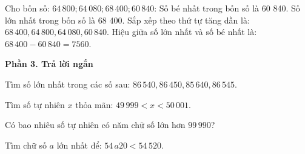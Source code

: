 \begin{ex} %
Cho bốn số: $64\,800; 64\,080; 68\,400; 60\,840$:
\choiceTF
{\True Số bé nhất trong bốn số là 60 840.}
{\True Số lớn nhất trong bốn số là 68 400.}
{Sắp xếp theo thứ tự tăng dần là: $68\,400, 64\,800, 64\,080, 60\,840$.}
{\True Hiệu giữa số lớn nhất và số bé nhất là: $68\,400 - 60\,840 = 7560$.}
\end{ex}

\textbf{Phần 3. Trả lời ngắn}

\begin{ex} %
Tìm số lớn nhất trong các số sau: $86\,540, 86\,450, 85\,640, 86\,545$.
\end{ex}

\begin{ex} %
Tìm số tự nhiên $x$ thỏa mãn: $49\,999 < x < 50\,001$.
\end{ex}

\begin{ex} %
Có bao nhiêu số tự nhiên có năm chữ số lớn hơn $99\,990$?
\end{ex}

\begin{ex} %
Tìm chữ số $a$ lớn nhất để: $54\,a20 < 54\,520$.
\end{ex}

